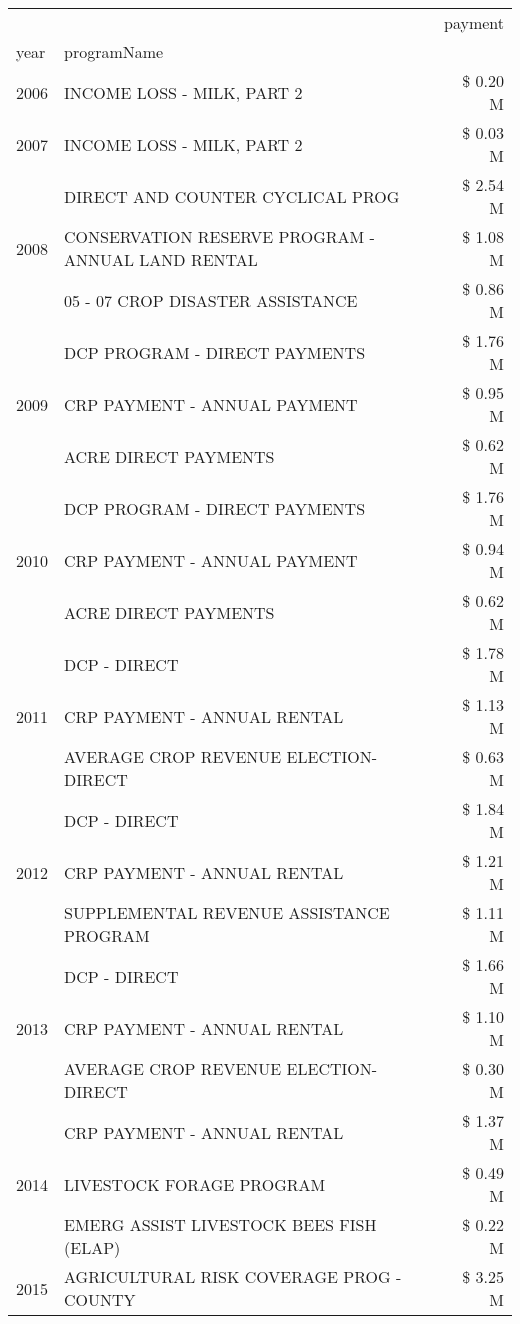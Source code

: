 \begin{tabular}{llr}
\toprule
 &  & payment \\
year & programName &  \\
\midrule
2006 & INCOME LOSS - MILK, PART 2 & \$ 0.20 M \\
\cline{1-3}
2007 & INCOME LOSS - MILK, PART 2 & \$ 0.03 M \\
\cline{1-3}
\multirow[t]{3}{*}{2008} & DIRECT AND COUNTER CYCLICAL PROG & \$ 2.54 M \\
 & CONSERVATION RESERVE PROGRAM - ANNUAL LAND RENTAL & \$ 1.08 M \\
 & 05 - 07 CROP DISASTER ASSISTANCE & \$ 0.86 M \\
\cline{1-3}
\multirow[t]{3}{*}{2009} & DCP PROGRAM - DIRECT PAYMENTS & \$ 1.76 M \\
 & CRP PAYMENT - ANNUAL PAYMENT & \$ 0.95 M \\
 & ACRE DIRECT PAYMENTS & \$ 0.62 M \\
\cline{1-3}
\multirow[t]{3}{*}{2010} & DCP PROGRAM - DIRECT PAYMENTS & \$ 1.76 M \\
 & CRP PAYMENT - ANNUAL PAYMENT & \$ 0.94 M \\
 & ACRE DIRECT PAYMENTS & \$ 0.62 M \\
\cline{1-3}
\multirow[t]{3}{*}{2011} & DCP - DIRECT & \$ 1.78 M \\
 & CRP PAYMENT - ANNUAL RENTAL & \$ 1.13 M \\
 & AVERAGE CROP REVENUE ELECTION-DIRECT & \$ 0.63 M \\
\cline{1-3}
\multirow[t]{3}{*}{2012} & DCP - DIRECT & \$ 1.84 M \\
 & CRP PAYMENT - ANNUAL RENTAL & \$ 1.21 M \\
 & SUPPLEMENTAL REVENUE ASSISTANCE PROGRAM & \$ 1.11 M \\
\cline{1-3}
\multirow[t]{3}{*}{2013} & DCP - DIRECT & \$ 1.66 M \\
 & CRP PAYMENT - ANNUAL RENTAL & \$ 1.10 M \\
 & AVERAGE CROP REVENUE ELECTION-DIRECT & \$ 0.30 M \\
\cline{1-3}
\multirow[t]{3}{*}{2014} & CRP PAYMENT - ANNUAL RENTAL & \$ 1.37 M \\
 & LIVESTOCK FORAGE PROGRAM & \$ 0.49 M \\
 & EMERG ASSIST LIVESTOCK BEES FISH (ELAP) & \$ 0.22 M \\
\cline{1-3}
\multirow[t]{3}{*}{2015} & AGRICULTURAL RISK COVERAGE PROG - COUNTY & \$ 3.25 M \\

\end{tabular}
